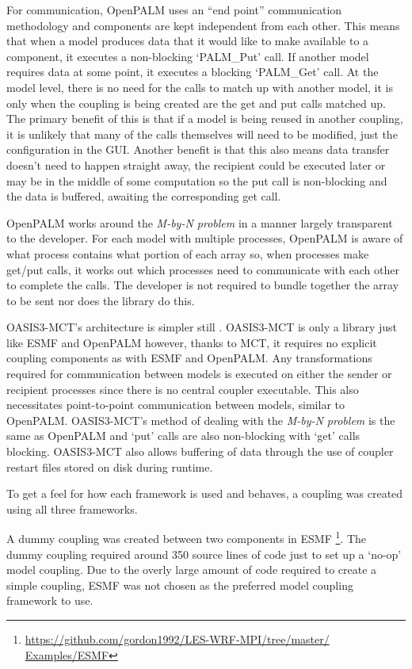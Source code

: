 For communication, OpenPALM uses an ``end point'' communication methodology
\cite{CERFACS2007} and components are kept independent from each other. This
means that when a model produces data that it would like to make available to a
component, it executes a non-blocking `PALM\_Put' call. If another model
requires data at some point, it executes a blocking `PALM\_Get' call. At the
model level, there is no need for the calls to match up with another model, it
is only when the coupling is being created are the get and put calls matched up.
The primary benefit of this is that if a model is being reused in another
coupling, it is unlikely that many of the calls themselves will need to be
modified, just the configuration in the GUI. Another benefit is that this also
means data transfer doesn't need to happen straight away, the recipient could be
executed later or may be in the middle of some computation so the put call is
non-blocking and the data is buffered, awaiting the corresponding get call.

OpenPALM works around the \textit{M-by-N problem} in a manner largely
transparent to the developer. For each model with multiple processes, OpenPALM
is aware of what process contains what portion of each array so, when processes
make get/put calls, it works out which processes need to communicate with each
other to complete the calls. The developer is not required to bundle together
the array to be sent nor does the library do this.

OASIS3-MCT's architecture is simpler still \cite{OASIS3-MCT2013}. OASIS3-MCT is
only a library just like ESMF and OpenPALM however, thanks to MCT, it requires
no explicit coupling components as with ESMF and OpenPALM. Any transformations
required for communication between models is executed on either the sender or
recipient processes since there is no central coupler executable. This also
necessitates point-to-point communication between models, similar to OpenPALM.
OASIS3-MCT's method of dealing with the \textit{M-by-N problem} is the same as
OpenPALM and `put' calls are also non-blocking with `get' calls blocking.
OASIS3-MCT also allows buffering of data through the use of coupler restart
files stored on disk during runtime.

To get a feel for how each framework is used and behaves, a coupling was created
using all three frameworks.

A dummy coupling was created between two components in ESMF
\footnote{\url{https://github.com/gordon1992/LES-WRF-MPI/tree/master/
Examples/ESMF}}. The dummy coupling required around 350 source lines of code
just to set up a `no-op' model coupling. Due to the overly large amount of code
required to create a simple coupling, ESMF was not chosen as the preferred model
coupling framework to use.

